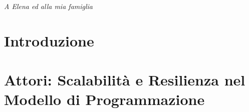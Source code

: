 \documentclass[a4paper, twoside]{book}
\begin{document}
    

    \thispagestyle{empty}
    \cleardoublepage

    \thispagestyle{empty}
    \null{}
        \begin{flushright}
            \textit{A Elena ed alla mia famiglia}
        \end{flushright}
    \null

    

    \tableofcontents
    \listoffigures

    \chapter{Introduzione}
    

    \chapter[Programmazione ad Attori]{Attori: Scalabilità e Resilienza nel Modello di Programmazione}
    

    

    \newpage
    \printbibliography
\end{document}
